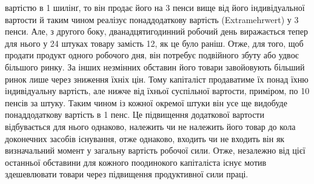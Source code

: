 \parcont{}  %
вартістю в 1 шилінґ, то він продає його на 3 пенси вище від його
індивідуальної вартости й таким чином реалізує понаддодаткову
вартість (Extramehrwert) у 3 пенси. Але, з другого боку, дванадцятигодинний
робочий день виражається тепер для нього у
24 штуках товару замість 12, як це було раніш. Отже, для
того, щоб продати продукт одного робочого дня, він потребує
подвійного збуту або удвоє більшого ринку. За інших незмінних
обставин його товари завойовують більший ринок лише через
зниження їхніх цін. Тому капіталіст продаватиме їх понад їхню
індивідуальну вартість, але нижче від їхньої суспільної вартости,
приміром, по 10 пенсів за штуку. Таким чином із кожної окремої
штуки він усе ще видобуде понаддодаткову вартість в 1 пенс. Це
підвищення додаткової вартости відбувається для нього однаково,
належить чи не належить його товар до кола доконечних
засобів існування, отже однаково, входить чи не входить він як
визначальний момент у загальну вартість робочої сили. Отже,
незалежно від цієї останньої обставини для кожного поодинокого
капіталіста існує мотив здешевлювати товари через підвищення
продуктивної сили праці.


